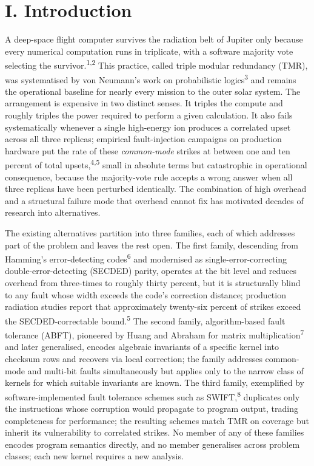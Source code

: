 \documentclass[12pt,a4paper]{article}
\theoremstyle{plain}
\theoremstyle{definition}
\begin{document}
\vspace{4pt}

\section{I. Introduction}

A deep-space flight computer survives the radiation belt of Jupiter only because every numerical computation runs in triplicate, with a software majority vote selecting the survivor.\textsuperscript{1,2} This practice, called triple modular redundancy (TMR), was systematised by von Neumann's work on probabilistic logics\textsuperscript{3} and remains the operational baseline for nearly every mission to the outer solar system. The arrangement is expensive in two distinct senses. It triples the compute and roughly triples the power required to perform a given calculation. It also fails systematically whenever a single high-energy ion produces a correlated upset across all three replicas; empirical fault-injection campaigns on production hardware put the rate of these \textit{common-mode} strikes at between one and ten percent of total upsets,\textsuperscript{4,5} small in absolute terms but catastrophic in operational consequence, because the majority-vote rule accepts a wrong answer when all three replicas have been perturbed identically. The combination of high overhead and a structural failure mode that overhead cannot fix has motivated decades of research into alternatives.

The existing alternatives partition into three families, each of which addresses part of the problem and leaves the rest open. The first family, descending from Hamming's error-detecting codes\textsuperscript{6} and modernised as single-error-correcting double-error-detecting (SECDED) parity, operates at the bit level and reduces overhead from three-times to roughly thirty percent, but it is structurally blind to any fault whose width exceeds the code's correction distance; production radiation studies report that approximately twenty-six percent of strikes exceed the SECDED-correctable bound.\textsuperscript{5} The second family, algorithm-based fault tolerance (ABFT), pioneered by Huang and Abraham for matrix multiplication\textsuperscript{7} and later generalised, encodes algebraic invariants of a specific kernel into checksum rows and recovers via local correction; the family addresses common-mode and multi-bit faults simultaneously but applies only to the narrow class of kernels for which suitable invariants are known. The third family, exemplified by software-implemented fault tolerance schemes such as SWIFT,\textsuperscript{8} duplicates only the instructions whose corruption would propagate to program output, trading completeness for performance; the resulting schemes match TMR on coverage but inherit its vulnerability to correlated strikes. No member of any of these families encodes program semantics directly, and no member generalises across problem classes; each new kernel requires a new analysis.
\end{document}
